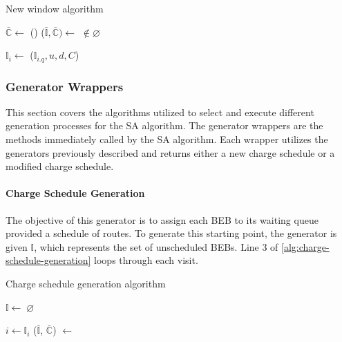 \documentclass[11pt,a4paper,final]{article}
\newcommand{\I}{\mathbb{I}}                 %
\newcommand{\C}{\mathbb{C}}                 %
\newcommand{\Sol}{\mathbb{S}}               %
\begin{document}
\begin{algorithm}[H]
  \caption{New window algorithm} \label{alg:new-window}
  \LinesNumbered
  \KwIn{$\Sol$}
  \KwOut{$\Sol'$}


  \Begin
  {
    $\bar{\C} \leftarrow$\Purge{$\Sol$}
    \If() {($\bar{\I}, \bar{\C}) \leftarrow$ \NewVisit{$\Sol'$} $\not\in \varnothing$}
    {
      \Return{($\bar{\I}, \bar{\C}$)} 
    }

    $\I_i \leftarrow$ ($\I_{i.q},u,d,C$)
    \Return{($\varnothing$)}
  }
\end{algorithm}

\subsubsection{Generator Wrappers}
\label{sec:generator-wrappers}
This section covers the algorithms utilized to select and execute different generation processes for the SA algorithm.
The generator wrappers are the methods immediately called by the SA algorithm. Each wrapper utilizes the generators
previously described and returns either a new charge schedule or a modified charge schedule.

\paragraph{Charge Schedule Generation}
\label{sec:charge-schedule-generation}
The objective of this generator is to assign each BEB to its waiting queue provided a schedule of routes. To generate
this starting point, the generator is given \(\I\), which represents the set of unscheduled BEBs. Line 3 of
\ref{alg:charge-schedule-generation} loops through each visit.

\begin{algorithm}[H]
\caption{Charge schedule generation algorithm} \label{alg:charge-schedule-generation}
    \LinesNumbered
    \KwIn{$\I$, $\C$}
    \KwOut{$\bar{\I}$, $\bar{\C}$}


    \Begin
    {
        $\I \leftarrow \; \varnothing$

        \ForEach {$\I_i \in \I$}
        {
            $i \leftarrow \I_i$
            ($\bar{\I}$, $\bar{\C}$) $\leftarrow$ \Wait{($i$, $\I$, $\C$)}
        }
            \Return{($\bar{\I}$, $\bar{\C}$)}
    }
  \end{algorithm}
\end{document}
